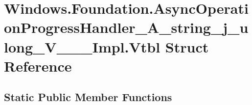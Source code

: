 \hypertarget{struct_windows_1_1_foundation_1_1_async_operation_progress_handler___a__string__j__ulong___v_______impl_1_1_vtbl}{}\section{Windows.\+Foundation.\+Async\+Operation\+Progress\+Handler\+\_\+\+A\+\_\+string\+\_\+j\+\_\+ulong\+\_\+\+V\+\_\+\+\_\+\+\_\+\+Impl.\+Vtbl Struct Reference}
\label{struct_windows_1_1_foundation_1_1_async_operation_progress_handler___a__string__j__ulong___v_______impl_1_1_vtbl}
\subsection*{Static Public Member Functions}
